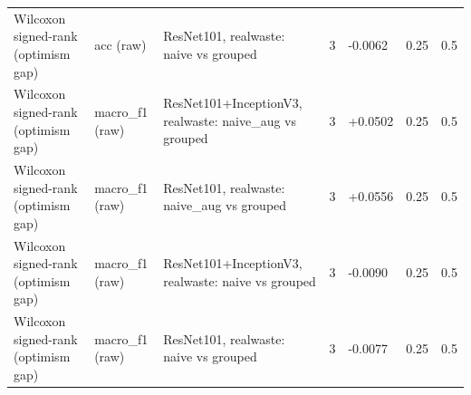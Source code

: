\begin{table}[ht]
\begin{tabular}{lllllll}
Wilcoxon signed-rank (optimism gap) & acc (raw) & ResNet101, realwaste: naive vs grouped & 3 & -0.0062 & 0.25 & 0.5 \\
Wilcoxon signed-rank (optimism gap) & macro\_f1 (raw) & ResNet101+InceptionV3, realwaste: naive\_aug vs grouped & 3 & +0.0502 & 0.25 & 0.5 \\
Wilcoxon signed-rank (optimism gap) & macro\_f1 (raw) & ResNet101, realwaste: naive\_aug vs grouped & 3 & +0.0556 & 0.25 & 0.5 \\
Wilcoxon signed-rank (optimism gap) & macro\_f1 (raw) & ResNet101+InceptionV3, realwaste: naive vs grouped & 3 & -0.0090 & 0.25 & 0.5 \\
Wilcoxon signed-rank (optimism gap) & macro\_f1 (raw) & ResNet101, realwaste: naive vs grouped & 3 & -0.0077 & 0.25 & 0.5 \\
\hline
\end{tabular}
\end{table}